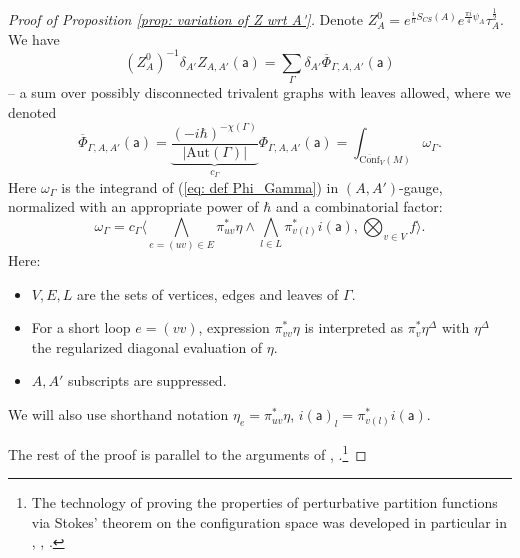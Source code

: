 \documentclass[11pt,a4paper]{amsart}
\theoremstyle{plain} %
\theoremstyle{definition}
\theoremstyle{remark}
\newcommand{\mr}{\mathrm}
\newcommand{\sfa}{\mathsf{a}}
\begin{document}
{%
\begin{proof}[%
Proof of Proposition \ref{prop: variation of Z wrt A'}]
Denote $Z^0_A=e^{\frac{i}{\hbar}S_{CS}(A)}e^{\frac{\pi i}{4}\psi_A}\tau_A^{\frac12}$.
We have
\begin{equation}
  (Z^0_A)^{-1}
  \delta_{A'} Z_{A,A'}(\sfa) =
\sum_{\Gamma} \delta_{A'}\overline{\Phi}_{\Gamma,A,A'}(\sfa)
\end{equation}
-- a sum over possibly disconnected trivalent graphs with leaves allowed,
where we denoted 
$$\overline{\Phi}_{\Gamma,A,A'}(\sfa)=\underbrace{\frac{(-i\hbar)^{-\chi(\Gamma)}}{|\mr{Aut}(\Gamma)|}}_{c_\Gamma}\Phi_{\Gamma,A,A'}(\sfa)=\int_{\overline{\mr{Conf}}_V(M)} \omega_\Gamma.  $$ 
Here $\omega_\Gamma$ is the integrand of (\ref{eq: def Phi_Gamma}) in $(A,A')$-gauge, normalized with an appropriate power of $\hbar$ and a combinatorial factor:
\begin{equation}
    \omega_\Gamma=c_\Gamma \Big\langle \bigwedge_{e=(uv)\in E} \pi^*_{uv} \eta\wedge \bigwedge_{l\in L} \pi^*_{v(l)}i(\sfa),\bigotimes_{v\in V}f \Big\rangle.
\end{equation}
Here:
\begin{itemize}
    \item $V,E,L$ are the sets of vertices, edges and leaves of $\Gamma$. 
    \item For a short loop $e=(vv)$, expression $\pi_{vv}^*\eta$ is interpreted as $\pi_v^* \eta^\Delta$ with $\eta^\Delta$ the regularized diagonal evaluation of $\eta$.
    \item $A,A'$ subscripts are suppressed.
\end{itemize}
We will also use shorthand notation $\eta_e= \pi^*_{uv}\eta$, $i(\sfa)_l=\pi_{v(l)}^* i(\sfa)$.


The rest of the proof is parallel to %
the arguments of \cite[Section 4.5, Appendix A]{Cattaneo2008}, \cite[Lemma 4.11]{Cattaneo2017}.\footnote{The technology of proving the properties of perturbative partition functions via Stokes' theorem on the configuration space was developed in particular in \cite[\S 6]{Axelrod1994}, \cite{Kontsevich1994}, \cite{Kontsevich2003}.
}



\end{proof}}
\end{document}
